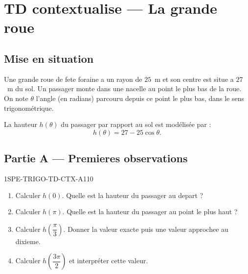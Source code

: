 

\section*{TD contextualise — La grande roue}

\subsection*{Mise en situation}

Une grande roue de fete foraine a un rayon de $25$~m et son centre est situe a $27$~m du sol. Un passager monte dans une nacelle au point le plus bas de la roue. On note $\theta$ l'angle (en radians) parcouru depuis ce point le plus bas, dans le sens trigonométrique.

La hauteur $h(\theta)$ du passager par rapport au sol est modélisée par :
\[
  h(\theta) = 27 - 25\cos\theta.
\]

\bigskip

\subsection*{Partie A — Premieres observations}

\begin{exercice}{1SPE-TRIGO-TD-CTX-A}{1}{10}
\begin{enumerate}
  \item Calculer $h(0)$. Quelle est la hauteur du passager au depart ?
  \item Calculer $h(\pi)$. Quelle est la hauteur du passager au point le plus haut ?
  \item Calculer $h\!\left(\dfrac{\pi}{3}\right)$. Donner la valeur exacte puis une valeur approchee au dixieme.
  \item Calculer $h\!\left(\dfrac{3\pi}{2}\right)$ et interpréter cette valeur.
\end{enumerate}
\end{exercice}

